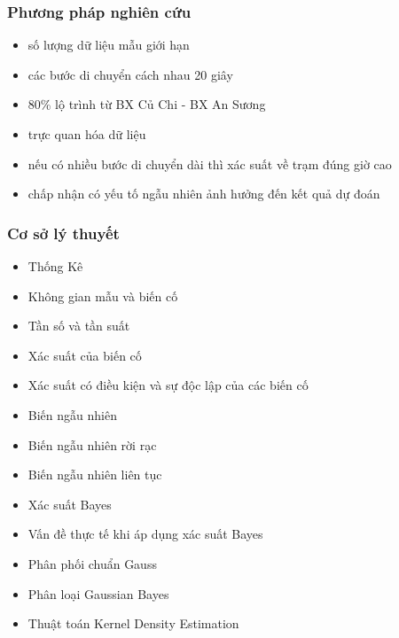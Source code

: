 \documentclass[t]{beamer}
\begin{document}

\begin{frame}
\frametitle{Phương pháp nghiên cứu}
\begin{itemize}
\item số lượng dữ liệu mẫu giới hạn
\item các bước di chuyển cách nhau 20 giây
\item 80\% lộ trình từ BX Củ Chi - BX An Sương
\item trực quan hóa dữ liệu
\item nếu có nhiều bước di chuyển dài thì xác suất về trạm đúng giờ cao
\item chấp nhận có yếu tố ngẫu nhiên ảnh hưởng đến kết quả dự đoán 
\end{itemize}
\end{frame}


\begin{frame}[t]
\frametitle{Cơ sở lý thuyết}
\begin{minipage}{0.48\linewidth}
\begin{itemize}
\item Thống Kê
\item Không gian mẫu và biến cố
\item Tần số và tần suất
\item Xác suất của biến cố
\item Xác suất có điều kiện và sự độc lập của các biến cố
\item Biến ngẫu nhiên
\item Biến ngẫu nhiên rời rạc
\item Biến ngẫu nhiên liên tục
\end{itemize}
\end{minipage}%
\hfill
\begin{minipage}{0.49\linewidth}
\begin{itemize}
\item Xác suất Bayes
\item Vấn đề thực tế khi áp dụng xác suất Bayes
\item Phân phối chuẩn Gauss
\item Phân loại Gaussian Bayes
\item Thuật toán Kernel Density Estimation 
\end{itemize}
\end{minipage}
\end{frame}
\end{document}
